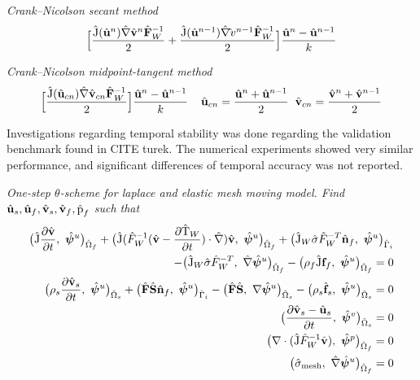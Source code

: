 \begin{discr}
\textit{Crank–Nicolson secant method}
\begin{align*}
\Big[\frac{\text{\^{J}}(\hat{\mathbf{u}}^{n}) \hat{\mathbf{\nabla}} \hat{\mathbf{v}}^{n} \hat{\mathbf{F}}_W^{-1}}{2} 
+ \frac{\text{\^{J}}(\hat{\mathbf{u}}^{n-1}) \hat{\mathbf{\nabla}} \hat{\mathbf{}}v^{n-1} \hat{\mathbf{F}}_W^{-1}}{2} \Big] 
\frac{\hat{\mathbf{u}}^{n} - \hat{\mathbf{u}}^{n-1}}{k}
\end{align*} 
\end{discr}

\begin{discr}
\textit{Crank–Nicolson midpoint-tangent method}
\begin{align*}
\Big[\frac{\text{\^{J}}(\hat{\mathbf{u}}_{cn}) \hat{\mathbf{\nabla}} \hat{\mathbf{v}}_{cn} \hat{\mathbf{F}}_W^{-1}}{2} \Big] 
\frac{\hat{\mathbf{u}}^{n} - \hat{\mathbf{u}}^{n-1}}{k} \hspace{4mm}
\hat{\mathbf{u}}_{cn} = \frac{\hat{\mathbf{u}}^{n} + \hat{\mathbf{u}}^{n-1}}{2} \hspace{2mm}
\hat{\mathbf{v}}_{cn} = \frac{\hat{\mathbf{v}}^{n} + \hat{\mathbf{v}}^{n-1}}{2}
\end{align*} 
\end{discr}

Investigations regarding temporal stability was done regarding the validation benchmark found in CITE turek. The numerical experiments showed very similar performance, and significant differences of temporal accuracy was not reported. 

\begin{prob}
\textit{One-step $\theta$-scheme for laplace and elastic mesh moving model.
Find $\hat{\mathbf{u}}_s, \hat{\mathbf{u}}_f, \hat{\mathbf{v}}_s, \hat{\mathbf{v}}_f, \text{\^{p}}_f $ such that}
\begin{align*}
\big(\text{\^{J}} \frac{\partial \hat{\mathbf{v}}}{\partial t}, \ \hat{\bm{\psi}}^u \big)_{\hat{\Omega}_f} +
\big(\text{\^{J}} (\hat{F}_W^{-1}(\hat{\mathbf{v}} - \frac{\partial \text{\^{T}}_W}{\partial t}) \cdot \hat{\nabla}) \hat{\mathbf{v}}, \ {\hat{\bm{\psi}}^u} \big)_{\hat{\Omega}_f}
+ \big(\text{\^{J}}_W \hat{\sigma}\hat{F}_W^{-T} \hat{\mathbf{n}}_f, \ {\hat{\bm{\psi}}^u} \big)_{\hat{\Gamma}_i} \\
- \big(\text{\^{J}}_W \hat{\sigma}\hat{F}_W^{-T}, \ {\hat{\nabla}\hat{\bm{\psi}}^u} \big)_{\hat{\Omega}_f} -
\big(\rho_f \text{\^{J}} \mathbf{f}_f, \ {{\hat{\bm{\psi}}^u}} \big)_{\hat{\Omega}_f} = 0 \\
\big(\rho_s \frac{\partial \hat{\mathbf{v}}_s}{\partial t}, \ {\hat{\bm{\psi}}^u} \big)_{\hat{\Omega}_s} + \big(\hat{\mathbf{F}}\hat{\mathbf{S}}\hat{\mathbf{n}}_f, \ {\hat{\bm{\psi}}^u} \big)_{\hat{\Gamma}_i}
- \big(\hat{\mathbf{F}}\hat{\mathbf{S}}, \ {\nabla \hat{\bm{\psi}}^u} \big)_{\hat{\Omega}_s} - \big(\rho_s \hat{\mathbf{f}}_s, \ {\hat{\bm{\psi}}^u} \big)_{\hat{\Omega}_s} = 0 \\
\big(\frac{\partial \hat{\mathbf{v}}_s - \hat{\mathbf{u}}_s}{\partial t}, \ {\hat{\bm{\psi}}^v} \big)_{\hat{\Omega}_s}  = 0\\
\big(\nabla \cdot (\text{\^{J}} \hat{F}_W^{-1} \hat{\mathbf{v}}), \ {\hat{\bm{\psi}}^p} \big)_{\hat{\Omega}_f} = 0 \\
\big(\hat{\sigma}_{\text{mesh}}, \ {\hat{\nabla}\hat{\bm{\psi}}^u} \big)_{\hat{\Omega}_f} = 0
\end{align*} 
\end{prob}

